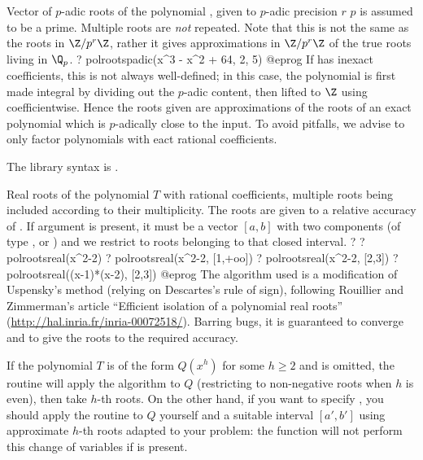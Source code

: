\label{se:polrootspadic}
Vector of $p$-adic roots of the polynomial , given to
$p$-adic precision $r$ $p$ is assumed to be a prime. Multiple roots are
\emph{not} repeated. Note that this is not the same as the roots in
$\Z/p^r\Z$, rather it gives approximations in $\Z/p^r\Z$ of the true roots
living in $\Q_p$.
\bprog
? polrootspadic(x^3 - x^2 + 64, 2, 5)
@eprog
If  has inexact  coefficients, this is not always
well-defined; in this case, the polynomial is first made integral by dividing
out the $p$-adic content, then lifted
to $\Z$ using  coefficientwise. Hence the roots given are
approximations of the roots of an exact polynomial which is $p$-adically
close to the input. To avoid pitfalls, we advise to only factor polynomials
with eact rational coefficients.

The library syntax is .

\label{se:polrootsreal}
Real roots of the polynomial $T$ with rational coefficients, multiple
roots being included according to their multiplicity. The roots are given
to a relative accuracy of . If argument  is
present, it must be a vector $[a,b]$ with two components (of type
,  or ) and we restrict to roots belonging
to that closed interval.
\bprog
? 
? polrootsreal(x^2-2)
? polrootsreal(x^2-2, [1,+oo])
? polrootsreal(x^2-2, [2,3])
? polrootsreal((x-1)*(x-2), [2,3])
@eprog\noindent
The algorithm used is a modification of Uspensky's method (relying on
Descartes's rule of sign), following Rouillier and Zimmerman's article
``Efficient isolation of a polynomial real roots''
(\url{http://hal.inria.fr/inria-00072518/}). Barring bugs, it is guaranteed
to converge and to give the roots to the required accuracy.

 If the polynomial $T$ is of the
form $Q(x^h)$ for some $h\geq 2$ and  is omitted, the routine will
apply the algorithm to $Q$ (restricting to non-negative roots when $h$ is
even), then take $h$-th roots. On the other hand, if you want to specify
, you should apply the routine to $Q$ yourself and a suitable
interval $[a',b']$ using approximate $h$-th roots adapted to your problem:
the function will not perform this change of variables if  is present.

